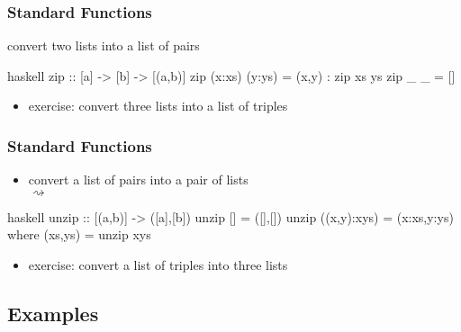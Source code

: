 \documentclass[dvipsnames]{beamer}
\theoremstyle{plain}
\begin{document}
\begin{frame}[fragile]
  \frametitle{Standard Functions}

  \begin{exampleblock}{convert two lists into a list of pairs}
    \begin{pygments}{haskell}
zip :: [a] -> [b] -> [(a,b)]
zip (x:xs) (y:ys) = (x,y) : zip xs ys
zip _      _      = []
    \end{pygments}
  \end{exampleblock}

  \pause
  \begin{itemize}
    \item exercise: convert three lists into a list of triples\\
  \end{itemize}
\end{frame}

\begin{frame}[fragile]
  \frametitle{Standard Functions}

  \begin{itemize}
    \item convert a list of pairs into a pair of lists\\
       $\rightsquigarrow$
  \end{itemize}

  \begin{exampleblock}{}
    \begin{pygments}{haskell}
unzip :: [(a,b)] -> ([a],[b])
unzip []          = ([],[])
unzip ((x,y):xys) = (x:xs,y:ys)
  where (xs,ys) = unzip xys
    \end{pygments}
  \end{exampleblock}

  \pause
  \begin{itemize}
    \item exercise: convert a list of triples into three lists\\
  \end{itemize}
\end{frame}


\subsection{Examples}
\end{document}

